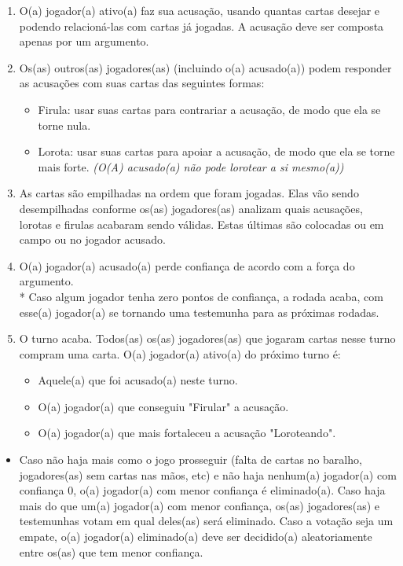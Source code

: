 \documentclass[a4paper, 11pt]{article}
\begin{document}
	\begin{enumerate}
		\item O(a) jogador(a) ativo(a) faz sua acusação, usando quantas cartas desejar e podendo relacioná-las com cartas já jogadas. A acusação deve ser composta apenas por um argumento.

		\item Os(as) outros(as) jogadores(as) (incluindo o(a) acusado(a)) podem responder as acusações com suas cartas das seguintes formas:
			\begin{itemize}
				\item Firula: usar suas cartas para contrariar a acusação, de modo que ela se torne nula.

				\item Lorota: usar suas cartas para apoiar a acusação, de modo que ela se torne mais forte. \textit{(O(A) acusado(a) não pode lorotear a si mesmo(a))}
			\end{itemize}

		\item As cartas são empilhadas na ordem que foram jogadas. Elas vão sendo desempilhadas conforme os(as) jogadores(as) analizam quais acusações, lorotas e firulas acabaram sendo válidas. Estas últimas são colocadas ou em campo ou no jogador acusado.

		\item O(a) jogador(a) acusado(a) perde confiança de acordo com a força do argumento. \\* Caso algum jogador tenha zero pontos de confiança, a rodada acaba, com esse(a) jogador(a) se tornando uma testemunha para as próximas rodadas.

		\item O turno acaba. Todos(as) os(as) jogadores(as) que jogaram cartas nesse turno compram uma carta. O(a) jogador(a) ativo(a) do próximo turno é:
			\begin{itemize}
				\item Aquele(a) que foi acusado(a) neste turno.

				\item O(a) jogador(a) que conseguiu "Firular" a acusação.

				\item O(a) jogador(a) que mais fortaleceu a acusação "Loroteando".
			\end{itemize}

	\end{enumerate}

	\begin{itemize}
		\item Caso não haja mais como o jogo prosseguir (falta de cartas no baralho, jogadores(as) sem cartas nas mãos, etc) e não haja nenhum(a) jogador(a) com confiança 0, o(a) jogador(a) com menor confiança é eliminado(a). Caso haja mais do que um(a) jogador(a) com menor confiança, os(as) jogadores(as) e testemunhas votam em qual deles(as) será eliminado. Caso a votação seja um empate, o(a) jogador(a) eliminado(a) deve ser decidido(a) aleatoriamente  entre os(as) que tem menor confiança.
	\end{itemize}
\end{document}
